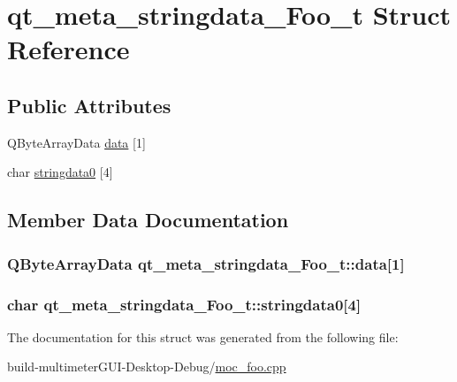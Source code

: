 \hypertarget{structqt__meta__stringdata___foo__t}{\section{qt\-\_\-meta\-\_\-stringdata\-\_\-\-Foo\-\_\-t Struct Reference}
\label{structqt__meta__stringdata___foo__t}
}
\subsection*{Public Attributes}
\begin{DoxyCompactItemize}
\item 
Q\-Byte\-Array\-Data \hyperlink{structqt__meta__stringdata___foo__t_a0b7e16f24101f1ced87e78e78b43ed94}{data} \mbox{[}1\mbox{]}
\item 
char \hyperlink{structqt__meta__stringdata___foo__t_a1a6f034fd9aa6ac4f6a66c0fdde4153e}{stringdata0} \mbox{[}4\mbox{]}
\end{DoxyCompactItemize}


\subsection{Member Data Documentation}
\hypertarget{structqt__meta__stringdata___foo__t_a0b7e16f24101f1ced87e78e78b43ed94}{
\subsubsection[{data}]{\setlength{\rightskip}{0pt plus 5cm}Q\-Byte\-Array\-Data qt\-\_\-meta\-\_\-stringdata\-\_\-\-Foo\-\_\-t\-::data\mbox{[}1\mbox{]}}}\label{structqt__meta__stringdata___foo__t_a0b7e16f24101f1ced87e78e78b43ed94}
\hypertarget{structqt__meta__stringdata___foo__t_a1a6f034fd9aa6ac4f6a66c0fdde4153e}{
\subsubsection[{stringdata0}]{\setlength{\rightskip}{0pt plus 5cm}char qt\-\_\-meta\-\_\-stringdata\-\_\-\-Foo\-\_\-t\-::stringdata0\mbox{[}4\mbox{]}}}\label{structqt__meta__stringdata___foo__t_a1a6f034fd9aa6ac4f6a66c0fdde4153e}


The documentation for this struct was generated from the following file\-:\begin{DoxyCompactItemize}
\item 
build-\/multimeter\-G\-U\-I-\/\-Desktop-\/\-Debug/\hyperlink{moc__foo_8cpp}{moc\-\_\-foo.\-cpp}\end{DoxyCompactItemize}
